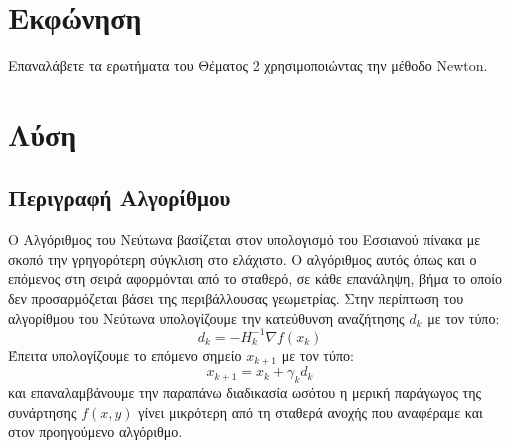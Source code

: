 \documentclass{report}
\begin{document}
\section{Εκφώνηση}
Επαναλάβετε τα ερωτήματα του Θέματος 2 χρησιμοποιώντας την μέθοδο 
Newton.
\section{Λύση}
\subsection{Περιγραφή Αλγορίθμου}
Ο Αλγόριθμος του Νεύτωνα βασίζεται στον υπολογισμό του Εσσιανού πίνακα με σκοπό την γρηγορότερη
σύγκλιση στο ελάχιστο. Ο αλγόριθμος αυτός όπως και ο επόμενος στη σειρά αφορμόνται από το σταθερό,
σε κάθε επανάληψη, βήμα το οποίο δεν προσαρμόζεται βάσει της περιβάλλουσας γεωμετρίας. Στην περίπτωση
του αλγορίθμου του Νεύτωνα υπολογίζουμε την κατεύθυνση αναζήτησης $d_k$ με τον τύπο: 
$$d_k = -H_k^{-1} \nabla f(x_k)$$
Έπειτα υπολογίζουμε το επόμενο σημείο $x_{k+1}$ με τον τύπο:
$$x_{k+1} = x_k + \gamma_k d_k$$
και επαναλαμβάνουμε την παραπάνω διαδικασία ωσότου η μερική παράγωγος της συνάρτησης $f(x,y)$
γίνει μικρότερη από τη σταθερά ανοχής που αναφέραμε και στον προηγούμενο αλγόριθμο. 
\end{document}

